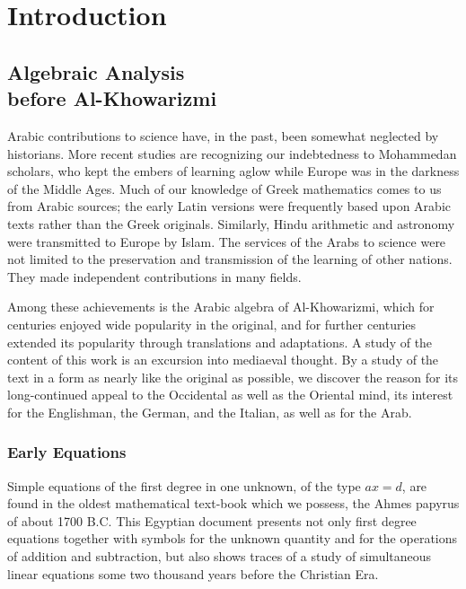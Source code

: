 \documentclass[11pt,a4paper]{book}
\begin{document}
\part{Introduction}

\chapter[Algebraic Analysis before Al-Khowarizmi]{Algebraic Analysis\\ before Al-Khowarizmi}

Arabic contributions to science have, in the past, been somewhat neglected by historians. More recent studies are recognizing our indebtedness to Mohammedan scholars, who kept the embers of learning aglow while Europe was in the darkness of the Middle Ages. Much of our knowledge of Greek mathematics comes to us from Arabic sources; the early Latin versions were frequently based upon Arabic texts rather than the Greek originals. Similarly, Hindu arithmetic and astronomy were transmitted to Europe by Islam. The services of the Arabs to science were not limited to the preservation and transmission of the learning of other nations. They made independent contributions in many fields.

Among these achievements is the Arabic algebra of Al-Khowarizmi, which for centuries enjoyed wide popularity in the original, and for further centuries extended its popularity through translations and adaptations. A study of the content of this work is an excursion into mediaeval thought. By a study of the text in a form as nearly like the original as possible, we discover the reason for its long-continued appeal to the Occidental as well as the Oriental mind, its interest for the Englishman, the German, and the Italian, as well as for the Arab.

\section{Early Equations}

Simple equations of the first degree in one unknown, of the type $ax = d$, are found in the oldest mathematical text-book which we possess, the Ahmes papyrus of about 1700 B.C. This Egyptian document presents not only first degree equations together with symbols for the unknown quantity and for the operations of addition and subtraction, but also shows traces of a study of simultaneous linear equations some two thousand years before the Christian Era.
\end{document}
